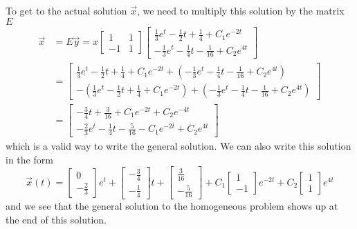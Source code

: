 \documentclass{ximera}
\begin{document}
\begin{exampleSol}
To get to the actual solution $\vec{x}$, we need to multiply this solution by the matrix $E$
\begin{equation*}
    \begin{split}
        \vec{x} &= E\vec{y} = x
        \begin{bmatrix} 
            1 & 1 \\ 
            -1 & 1 
        \end{bmatrix} 
        \begin{bmatrix} 
            \frac{1}{3}e^t - \frac{1}{2} t + \frac{1}{4} + C_1e^{-2t} \\
            -\frac{1}{3}e^{t} - \frac{1}{4}t - \frac{1}{16} + C_2e^{4t}
        \end{bmatrix} \\
        &= 
        \begin{bmatrix}
            \frac{1}{3}e^t - \frac{1}{2} t + \frac{1}{4} + C_1e^{-2t} + (-\frac{1}{3}e^{t} - \frac{1}{4}t - \frac{1}{16} + C_2e^{4t}) \\
            -(\frac{1}{3}e^t - \frac{1}{2} t + \frac{1}{4} + C_1e^{-2t}) + (-\frac{1}{3}e^{t} - \frac{1}{4}t - \frac{1}{16} + C_2e^{4t}) 
        \end{bmatrix} \\
        &= 
        \begin{bmatrix} 
            -\frac{3}{4}t + \frac{3}{16} + C_1e^{-2t} + C_2e^{-4t} \\ 
            -\frac{2}{3}e^{t} - \frac{1}{4}t - \frac{5}{16} - C_1e^{-2t} + C_2e^{4t} 
        \end{bmatrix}
    \end{split}
\end{equation*}
which is a valid way to write the general solution. We can also write this solution in the form
\begin{equation*}
    \vec{x}(t) = 
    \begin{bmatrix} 
        0 \\ 
        -\frac{2}{3} 
    \end{bmatrix} 
    e^t + 
    \begin{bmatrix} 
        -\frac{3}{4} \\ 
        -\frac{1}{4} 
    \end{bmatrix} 
    t + 
    \begin{bmatrix} 
        \frac{3}{16} \\ 
        -\frac{5}{16} 
    \end{bmatrix} 
    + C_1\begin{bmatrix} 
        1 \\ 
        -1 
    \end{bmatrix}
    e^{-2t} + C_2
    \begin{bmatrix} 
        1 \\ 
        1 
    \end{bmatrix} 
    e^{4t}
\end{equation*}
and we see that the general solution to the homogeneous problem shows up at the end of this solution.


\end{exampleSol}
\end{document}
